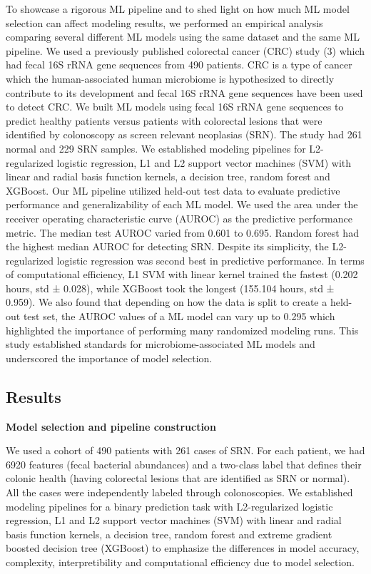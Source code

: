 \documentclass[11pt,]{article}
\begin{document}
To showcase a rigorous ML pipeline and to shed light on how much ML
model selection can affect modeling results, we performed an empirical
analysis comparing several different ML models using the same dataset
and the same ML pipeline. We used a previously published colorectal
cancer (CRC) study (3) which had fecal 16S rRNA gene sequences from 490
patients. CRC is a type of cancer which the human-associated human
microbiome is hypothesized to directly contribute to its development and
fecal 16S rRNA gene sequences have been used to detect CRC. We built ML
models using fecal 16S rRNA gene sequences to predict healthy patients
versus patients with colorectal lesions that were identified by
colonoscopy as screen relevant neoplasias (SRN). The study had 261
normal and 229 SRN samples. We established modeling pipelines for
L2-regularized logistic regression, L1 and L2 support vector machines
(SVM) with linear and radial basis function kernels, a decision tree,
random forest and XGBoost. Our ML pipeline utilized held-out test data
to evaluate predictive performance and generalizability of each ML
model. We used the area under the receiver operating characteristic
curve (AUROC) as the predictive performance metric. The median test
AUROC varied from 0.601 to 0.695. Random forest had the highest median
AUROC for detecting SRN. Despite its simplicity, the L2-regularized
logistic regression was second best in predictive performance. In terms
of computational efficiency, L1 SVM with linear kernel trained the
fastest (0.202 hours, std ± 0.028), while XGBoost took the longest
(155.104 hours, std ± 0.959). We also found that depending on how the
data is split to create a held-out test set, the AUROC values of a ML
model can vary up to 0.295 which highlighted the importance of
performing many randomized modeling runs. This study established
standards for microbiome-associated ML models and underscored the
importance of model selection.

\subsection{Results}\label{results}

\textbf{Model selection and pipeline construction}

We used a cohort of 490 patients with 261 cases of SRN. For each
patient, we had 6920 features (fecal bacterial abundances) and a
two-class label that defines their colonic health (having colorectal
lesions that are identified as SRN or normal). All the cases were
independently labeled through colonoscopies. We established modeling
pipelines for a binary prediction task with L2-regularized logistic
regression, L1 and L2 support vector machines (SVM) with linear and
radial basis function kernels, a decision tree, random forest and
extreme gradient boosted decision tree (XGBoost) to emphasize the
differences in model accuracy, complexity, interpretibility and
computational efficiency due to model selection.
\end{document}
